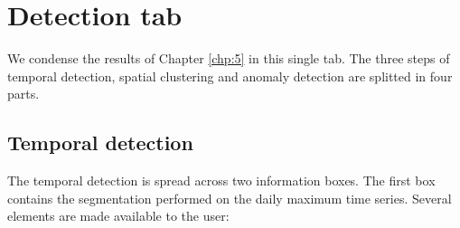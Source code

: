 \section{Detection tab}\label{chp:6:2}

We condense the results of Chapter \ref{chp:5} in this single tab. The three steps of temporal detection, spatial clustering and anomaly detection are splitted in four parts.  

\subsection{Temporal detection}\label{chp:6:2:temp}

The temporal detection is spread across two information boxes. The first box contains the segmentation performed on the daily maximum time series. Several elements are made available to the user:  
